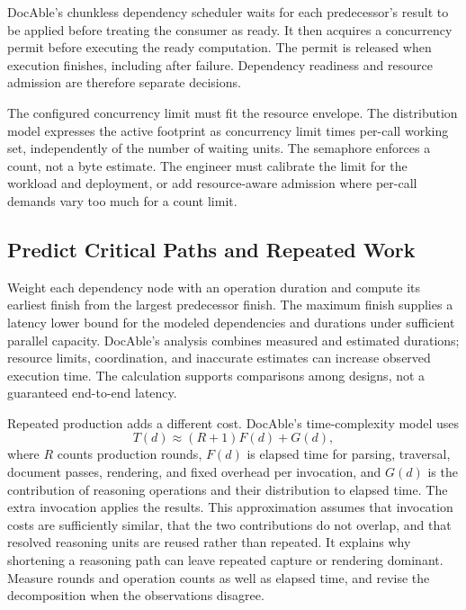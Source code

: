 DocAble's chunkless dependency scheduler waits for each predecessor's result to be applied before treating the consumer as ready. It then acquires a concurrency permit before executing the ready computation. The permit is released when execution finishes, including after failure. Dependency readiness and resource admission are therefore separate decisions.

The configured concurrency limit must fit the resource envelope. The distribution model expresses the active footprint as concurrency limit times per-call working set, independently of the number of waiting units. The semaphore enforces a count, not a byte estimate. The engineer must calibrate the limit for the workload and deployment, or add resource-aware admission where per-call demands vary too much for a count limit.

\subsection*{Predict Critical Paths and Repeated Work}

Weight each dependency node with an operation duration and compute its earliest finish from the largest predecessor finish. The maximum finish supplies a latency lower bound for the modeled dependencies and durations under sufficient parallel capacity. DocAble's analysis combines measured and estimated durations; resource limits, coordination, and inaccurate estimates can increase observed execution time. The calculation supports comparisons among designs, not a guaranteed end-to-end latency.

Repeated production adds a different cost. DocAble's time-complexity model uses
\[
T(d) \approx (R+1)F(d)+G(d),
\]
where \(R\) counts production rounds, \(F(d)\) is elapsed time for parsing, traversal, document passes, rendering, and fixed overhead per invocation, and \(G(d)\) is the contribution of reasoning operations and their distribution to elapsed time. The extra invocation applies the results. This approximation assumes that invocation costs are sufficiently similar, that the two contributions do not overlap, and that resolved reasoning units are reused rather than repeated. It explains why shortening a reasoning path can leave repeated capture or rendering dominant. Measure rounds and operation counts as well as elapsed time, and revise the decomposition when the observations disagree.

